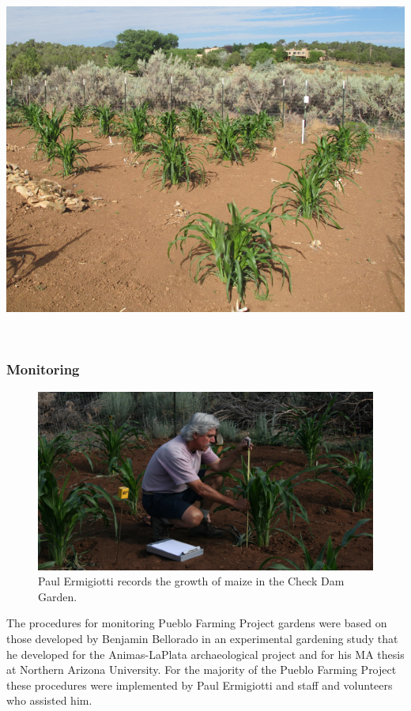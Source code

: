 \documentclass[12pt,]{article}
\begin{document}
\includegraphics{./images/planting/9_planting.jpg}

~

\hypertarget{monitoring}{%
\subsubsection*{Monitoring}\label{monitoring}}

\begin{figure}
\centering
\includegraphics{./images/chapter_3_header.jpg}
\caption{Paul Ermigiotti records the growth of maize in the Check Dam Garden.}
\end{figure}

The procedures for monitoring Pueblo Farming Project gardens were based on those developed by Benjamin Bellorado in an experimental gardening study that he developed for the Animas-LaPlata archaeological project and for his MA thesis at Northern Arizona University. For the majority of the Pueblo Farming Project these procedures were implemented by Paul Ermigiotti and staff and volunteers who assisted him.
\end{document}
